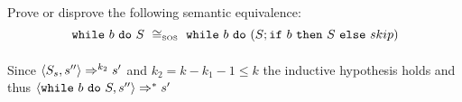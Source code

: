 \begin{exercise}{
    Prove or disprove the following semantic equivalence:
    \[ \wwhile{b}{S}\ \SOScong\ \wwhile{b}{(S;\wif{b}{S}{skip})} \]
}
\begin{itemize}
\begin{itemize}
\begin{itemize}
\begin{itemize}
\begin{align*}
                                    \end{align*}
                                    Since $\left<S_s, s''\right> \Rightarrow^{k_2} s'$ and $k_2 = k - k_1 - 1 \leq k$ the inductive hypothesis holds and thus $\left<\texttt{while}\ b\ \texttt{do}\ S, s''\right> \Rightarrow^* s'$
                            \end{itemize}
                    \end{itemize}
            \end{itemize}
    \end{itemize}
\end{exercise}
